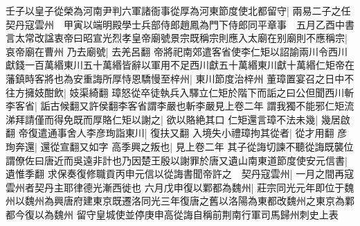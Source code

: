 壬子以皇子從榮為河南尹判六軍諸衙事從厚為河東節度使北都留守|{
	兩易二子之任}
契丹寇雲州　甲寅以端明殿學士兵部侍郎趙鳳為門下侍郎同平章事　五月乙酉中書言太常改諡衷帝曰昭宣光烈孝皇帝廟號景宗既稱宗則應入太廟在别廟則不應稱宗|{
	哀帝廟在曹州}
乃去廟號|{
	去羌呂翻}
帝將祀南郊遣客省使李仁矩以詔諭兩川令西川獻錢一百萬緡東川五十萬緡皆辭以軍用不足西川獻五十萬緡東川獻十萬緡仁矩帝在藩鎮時客將也為安重誨所厚恃恩驕慢至梓州|{
	東川節度治梓州}
董璋置宴召之日中不往方擁妓酣飲|{
	妓渠綺翻}
璋怒從卒徒執兵入驛立仁矩於階下而詬之曰公但聞西川斬李客省|{
	詬古候翻又許侯翻李客省謂李嚴也斬李嚴見上卷二年}
謂我獨不能邪仁矩流涕拜請僅而得免既而厚賂仁矩以謝之|{
	欲以賂絶其口}
仁矩還言璋不法未幾|{
	幾居啟翻}
帝復遣通事舍人李彦珣詣東川|{
	復扶又翻}
入境失小禮璋拘其從者|{
	從才用翻}
彦珣奔還|{
	還從宣翻又如字}
高季興之叛也|{
	見上卷二年}
其子從誨切諫不聽從誨既襲位謂僚佐曰唐近而吳遠非計也乃因楚王殷以謝罪於唐又遺山南東道節度使安元信書|{
	遺惟季翻}
求保奏復修職貢丙申元信以從誨書聞帝許之　契丹寇雲州|{
	一月之間再寇雲州者契丹主耶律德光漸西徙也}
六月戊申復以鄴都為魏州|{
	莊宗同光元年即位于魏州以魏州為興唐府建東京既遷洛同光三年復唐之舊以洛陽為東都改魏州之東京為鄴都今復以為魏州}
留守皇城使並停庚申高從誨自稱前荆南行軍司馬歸州刺史上表

